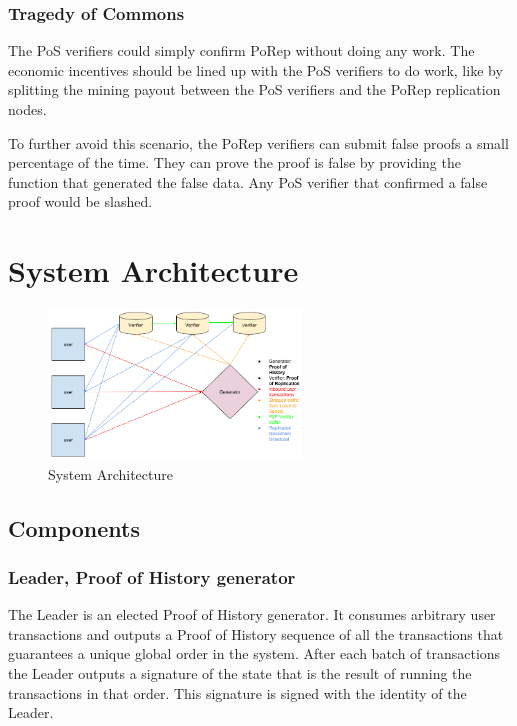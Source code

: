 \documentclass[12pt]{ltjsarticle}
\begin{document}
\subsubsection{Tragedy of Commons}

The PoS verifiers could simply confirm PoRep without doing any work. The economic incentives should be lined up with the PoS verifiers to do work, like by splitting the mining payout between the PoS verifiers and the PoRep replication nodes.

To further avoid this scenario, the PoRep verifiers can submit false proofs a small percentage of the time. They can prove the proof is false by providing the function that generated the false data. Any PoS verifier that confirmed a false proof would be slashed.

\section{System Architecture}\label{system_architecture}

\begin{figure}
  \begin{center}
    \centering
    \includegraphics[width=0.6\textwidth]{../../figures/fig_9.png}
    \caption[Fig 9]{System Architecture \label{fig_9}}
  \end{center}
  \end{figure}

\subsection{Components}

\subsubsection{Leader, Proof of History generator}
The Leader is an elected Proof of History generator. It consumes arbitrary user transactions and outputs a Proof of History sequence of all the transactions that guarantees a unique global order in the system. After each batch of transactions the Leader outputs a signature of the state that is the result of running the transactions in that order. This signature is signed with the identity of the Leader.
\end{document}
